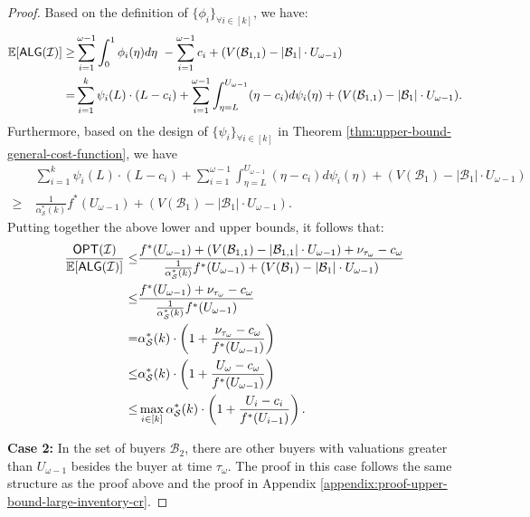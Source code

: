 \begin{proof}
Based on the definition of $\{\phi_{i}\}_{\forall i\in[k]}$, we have:
\begin{align*}
    \mathbb{E} [\textsf{ALG}(\mathcal{I})]
     \ge & \sum_{i=1}^{\omega-1} \int_{0}^{1} \phi_i(\eta) d\eta \  - \sum_{i=1}^{\omega-1} c_{i}  + (V(\mathcal{B}_{1,1}) - |\mathcal{B}_{1}| \cdot U_{\omega-1})  \\
   = & \sum_{i=1}^{k} \psi_{i}(L) \cdot (L - c_{i})+ \sum_{i=1}^{\omega-1} \int_{\eta =L}^{U_{\omega-1}} (\eta - c_{i} )d\psi_{i}(\eta) + (V(\mathcal{B}_{1,1}) - |\mathcal{B}_{1}| \cdot U_{\omega-1}).
\end{align*}
Furthermore, based on the design of $\{\psi_{i}\}_{\forall i \in [k]}$ in Theorem \ref{thm:upper-bound-general-cost-function}, we have
\begin{align*}
    &\sum_{i=1}^{k} \psi_{i}(L) \cdot (L - c_{i}) + \sum_{i=1}^{\omega-1} \int_{\eta =L}^{U_{\omega-1}} (\eta - c_{i} )d\psi_{i}(\eta) + (V(\mathcal{B}_{1}) - |\mathcal{B}_{1}| \cdot U_{\omega-1})  \\
   \ge\  &  \frac{1}{\alpha_{\mathcal{S}}^{*}(k)} f^{*}(U_{\omega-1}) + (V(\mathcal{B}_{1}) - |\mathcal{B}_{1}| \cdot U_{\omega-1}).
\end{align*}
Putting together the above lower and upper bounds, it follows that:
\begin{align*}
    \frac{\textsf{OPT}(\mathcal{I})}{ \mathbb{E} [\textsf{ALG}(\mathcal{I})]}
    \leq & \frac{f^{*}(U_{\omega-1}) + (V(\mathcal{B}_{1,1}) - |\mathcal{B}_{1,1}| \cdot U_{\omega-1} ) + \nu_{\tau_{\omega}} - c_{\omega}}{\frac{1}{\alpha_{\mathcal{S}}^*(k)} f^{*}(U_{\omega-1}) + (V(\mathcal{B}_{1}) - |\mathcal{B}_{1}| \cdot U_{\omega-1})} \\
    \leq & \frac{f^{*}(U_{\omega-1})  + \nu_{\tau_{\omega}} - c_{\omega}}{\frac{1}{\alpha_{\mathcal{S}}^*(k)} f^{*}(U_{\omega-1})} \\
     = & \alpha_{\mathcal{S}}^*(k) \cdot \left(1+\frac{\nu_{\tau_{\omega}}-c_{\omega}}{f^{*}(U_{\omega-1})} \right) \\
    \leq & \alpha_{\mathcal{S}}^*(k) \cdot \left(1+\frac{U_{\omega}-c_{\omega}}{f^{*}(U_{\omega-1})} \right) \\
    \leq & \max_{{i \in [k]}} \alpha_{\mathcal{S}}^*(k) \cdot \left( 1+\frac{U_{i}-c_{i}}{f^{*}(U_{i-1})} \right).
\end{align*} 

\textbf{Case 2:}
In the set of buyers $\mathcal{B}_{2}$, there are other buyers with valuations greater than $U_{\omega-1}$ besides the buyer at time $\tau_{\omega}$.
The proof in this case follows the same structure as the proof above and the proof in Appendix \ref{appendix:proof-upper-bound-large-inventory-cr}.
\end{proof}